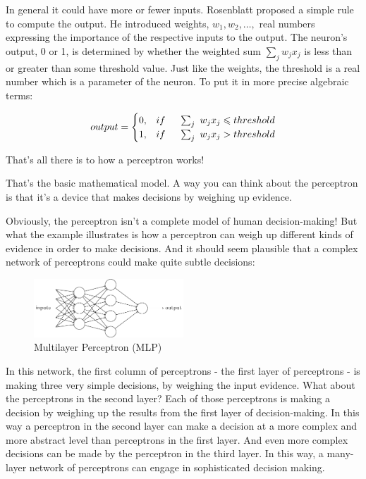 \documentclass[12 pt]{article}
\begin{document}
In general it could have more or fewer inputs. Rosenblatt proposed a
simple rule to compute the output. He introduced weights,
$ w_1,w_2,\ldots{}, $ real numbers expressing the importance of the respective
inputs to the output. The neuron's output, 0 or 1, is determined by
whether the weighted sum $ \sum_j w_j x_j $ is less than or
greater than some threshold value. Just like the weights, the threshold
is a real number which is a parameter of the neuron. To put it in more
precise algebraic terms:

\begin{equation}
    output =
    \begin{cases}
        0,& if \hspace{0.5 cm} \sum_j\ w_jx_j \leqslant threshold \\
        1,& if \hspace{0.5 cm} \sum_j\ w_jx_j > threshold
    \end{cases}
\end{equation}

That's all there is to how a perceptron works!

That's the basic mathematical model. A way you can think about the
perceptron is that it's a device that makes decisions by weighing up
evidence.

Obviously, the perceptron isn't a complete model of human
decision-making! But what the example illustrates is how a perceptron
can weigh up different kinds of evidence in order to make decisions. And
it should seem plausible that a complex network of perceptrons could
make quite subtle decisions:

\begin{figure}[htp]
\centering
\includegraphics[width=0.5\textwidth]{./figs/tikz1.png}
\caption{Multilayer Perceptron (MLP)}
\end{figure}

In this network, the first column of perceptrons - the first layer of
perceptrons - is making three very simple decisions, by weighing the
input evidence. What about the perceptrons in the second layer? Each of
those perceptrons is making a decision by weighing up the results from
the first layer of decision-making. In this way a perceptron in the
second layer can make a decision at a more complex and more abstract
level than perceptrons in the first layer. And even more complex
decisions can be made by the perceptron in the third layer. In this way,
a many-layer network of perceptrons can engage in sophisticated decision
making.
\end{document}
